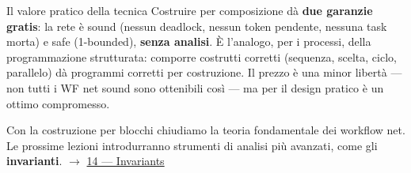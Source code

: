 \begin{boxtip}{Il valore pratico della tecnica}
Costruire per composizione dà \textbf{due garanzie gratis}: la rete è sound (nessun deadlock, nessun token pendente, nessuna task morta) e safe (1-bounded), \textbf{senza analisi}. È l'analogo, per i processi, della programmazione strutturata: comporre costrutti corretti (sequenza, scelta, ciclo, parallelo) dà programmi corretti per costruzione. Il prezzo è una minor libertà — non tutti i WF net sound sono ottenibili così — ma per il design pratico è un ottimo compromesso.
\end{boxtip}

Con la costruzione per blocchi chiudiamo la teoria fondamentale dei workflow net. Le prossime lezioni introdurranno strumenti di analisi più avanzati, come gli \textbf{invarianti}. $\rightarrow$ \hyperref[ch:14]{14 — Invariants}